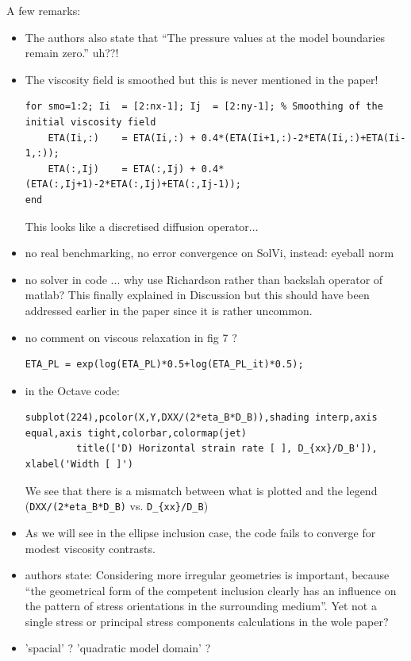 A few remarks:
\begin{itemize}
\item The authors also state that ``The pressure values at the model boundaries remain zero.'' uh??!
\item The viscosity field is smoothed but this is never mentioned in the paper!
\begin{verbatim}
for smo=1:2; Ii  = [2:nx-1]; Ij  = [2:ny-1]; % Smoothing of the initial viscosity field
    ETA(Ii,:)    = ETA(Ii,:) + 0.4*(ETA(Ii+1,:)-2*ETA(Ii,:)+ETA(Ii-1,:));
    ETA(:,Ij)    = ETA(:,Ij) + 0.4*(ETA(:,Ij+1)-2*ETA(:,Ij)+ETA(:,Ij-1));
end
\end{verbatim}
This looks like a discretised diffusion operator...

\item no real benchmarking, no error convergence on SolVi, instead: eyeball norm
\item no solver in code ... why use Richardson rather than backslah operator of matlab? This finally explained in Discussion but
this should have been addressed earlier in the paper since it is rather uncommon.  
\item no comment on viscous relaxation in fig 7 ?
\begin{verbatim}
ETA_PL = exp(log(ETA_PL)*0.5+log(ETA_PL_it)*0.5);
\end{verbatim}
 
\item in the Octave code:
\begin{verbatim}
subplot(224),pcolor(X,Y,DXX/(2*eta_B*D_B)),shading interp,axis equal,axis tight,colorbar,colormap(jet)
         title(['D) Horizontal strain rate [ ], D_{xx}/D_B']), xlabel('Width [ ]')
\end{verbatim}
We see that there is a mismatch between what is plotted and the legend (\verb|DXX/(2*eta_B*D_B)| vs. \verb|D_{xx}/D_B|)

\item As we will see in the ellipse inclusion case, the code fails to converge
for modest viscosity contrasts.

\item authors state: Considering more irregular geometries is important, 
because “the geometrical form of the competent
inclusion clearly has an influence on the pattern of stress orientations in the
surrounding medium”. Yet not a single stress or principal stress components calculations in the wole paper? 


\item 'spacial' ? 'quadratic model domain' ?


\end{itemize}
